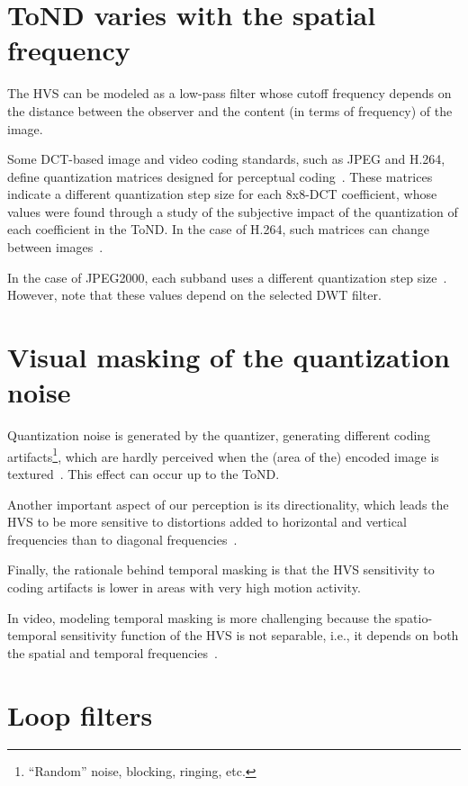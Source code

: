 \section{ToND varies with the spatial frequency}
The HVS can be modeled as a low-pass filter whose cutoff frequency
depends on the distance between the observer and the content (in terms
of frequency) of the image.

Some DCT-based image and video coding standards, such as JPEG and
H.264, define quantization matrices designed for perceptual
coding~\cite{ernawan2014optimal}. These matrices indicate a different
quantization step size for each 8x8-DCT coefficient, whose values were
found through a study of the subjective impact of the quantization of
each coefficient in the ToND. In the case of H.264, such matrices can
change between images~\cite{naccari2014perceptually}.

In the case of JPEG2000, each subband uses a different quantization
step size~\cite{liu2020visibility}. However, note that these values
depend on the selected DWT filter.

\section{Visual masking of the quantization noise}

Quantization noise is generated by the quantizer, generating
different coding artifacts\footnote{``Random'' noise, blocking,
  ringing, etc.}, which are hardly perceived when the (area of the)
encoded image is textured~\cite{wu2017digital}. This effect can
occur up to the ToND.

Another important aspect of our perception is its directionality,
which leads the HVS to be more sensitive to distortions added to
horizontal and vertical frequencies than to diagonal
frequencies~\cite{naccari2014perceptually}.

Finally, the rationale behind temporal masking is that the HVS
sensitivity to coding artifacts is lower in areas with very high
motion activity.

In video, modeling temporal masking is more challenging because
the spatio-temporal sensitivity function of the HVS is not separable,
i.e., it depends on both the spatial and temporal
frequencies~\cite{naccari2014perceptually}.

\section{Loop filters}

